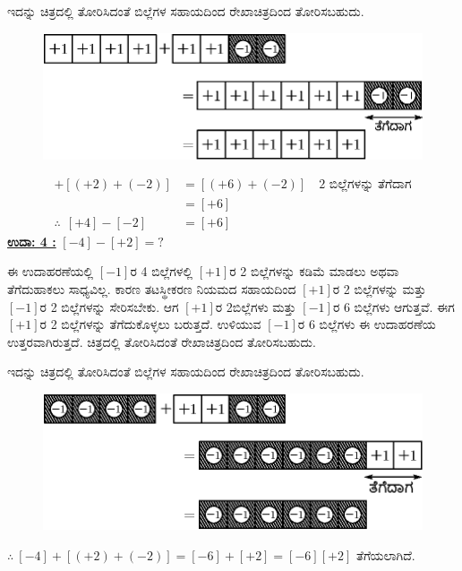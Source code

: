 ಇದನ್ನು ಚಿತ್ರದಲ್ಲಿ ತೋರಿಸಿದಂತೆ ಬಿಲ್ಲೆಗಳ ಸಹಾಯದಿಂದ ರೇಖಾಚಿತ್ರದಿಂದ ತೋರಿಸಬಹುದು. 
\begin{figure}[H]
\centering
\includegraphics[scale=0.8]{src/figure/chap3/fig3-14b.eps}
\end{figure}
\begin{align*}
[+4]+[(+2)+(-2)] &= [(+6)+(-2)]\quad \text{2 ಬಿಲ್ಲೆಗಳನ್ನು ತೆಗೆದಾಗ}\\
                 &= [+6]\\
                 \therefore ~~ [+4] - [-2] & = [+6]
\end{align*}
\noindent
{\textbf{\underline{ಉದಾ: 4 :}}} $[-4] - [+2] = ?$

ಈ ಉದಾಹರಣೆಯಲ್ಲಿ $[-1]$ರ 4 ಬಿಲ್ಲೆಗಳಲ್ಲಿ $[+1]$ರ 2 ಬಿಲ್ಲೆಗಳನ್ನು ಕಡಿಮೆ ಮಾಡಲು ಅಥವಾ ತೆಗೆದುಹಾಕಲು ಸಾಧ್ಯವಿಲ್ಲ. ಕಾರಣ ತಟಸ್ಥೀಕರಣ ನಿಯಮದ ಸಹಾಯದಿಂದ $[+1]$ರ 2 ಬಿಲ್ಲೆಗಳನ್ನು ಮತ್ತು $[-1]$ರ 2 ಬಿಲ್ಲೆಗಳನ್ನು ಸೇರಿಸಬೇಕು. ಆಗ $[+1]$ರ 2\break ಬಿಲ್ಲೆಗಳು ಮತ್ತು $[-1]$ರ 6 ಬಿಲ್ಲೆಗಳು ಆಗುತ್ತವೆ. ಈಗ $[+1]$ರ 2 ಬಿಲ್ಲೆಗಳನ್ನು ತೆಗೆದುಕೊಳ್ಳಲು ಬರುತ್ತದೆ. ಉಳಿಯುವ $[-1]$ರ 6 ಬಿಲ್ಲೆಗಳು ಈ ಉದಾಹರಣೆಯ ಉತ್ತರವಾಗಿರುತ್ತದೆ. ಚಿತ್ರದಲ್ಲಿ ತೋರಿಸಿದಂತೆ ರೇಖಾಚಿತ್ರದಿಂದ ತೋರಿಸಬಹುದು.

ಇದನ್ನು ಚಿತ್ರದಲ್ಲಿ ತೋರಿಸಿದಂತೆ ಬಿಲ್ಲೆಗಳ ಸಹಾಯದಿಂದ ರೇಖಾಚಿತ್ರದಿಂದ ತೋರಿಸಬಹುದು.
\begin{figure}[H]
\centering
\includegraphics[scale=0.8]{src/figure/chap3/fig3-15b.eps}
\end{figure}
$\therefore \ [-4]+[(+2)+(-2)]=[-6]+[+2]=[-6]$\qquad $[+2]$ ತೆಗೆಯಲಾಗಿದೆ.


